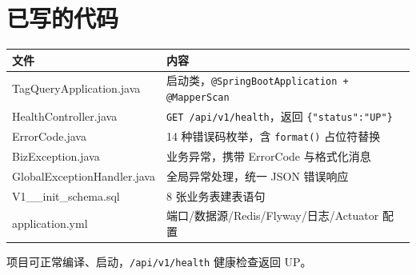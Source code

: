 \documentclass[12pt,a4paper]{ctexart}
\begin{document}
\section{已写的代码}

\begin{table}[h]
\centering
\begin{tabular}{lp{7cm}}
\toprule
文件 & 内容 \\
\midrule
\ttfamily TagQueryApplication.java & 启动类，\texttt{@SpringBootApplication + @MapperScan} \\
\ttfamily HealthController.java & \texttt{GET /api/v1/health}，返回 \texttt{\{"status":"UP"\}} \\
\ttfamily ErrorCode.java & 14 种错误码枚举，含 \texttt{format()} 占位符替换 \\
\ttfamily BizException.java & 业务异常，携带 ErrorCode 与格式化消息 \\
\ttfamily GlobalExceptionHandler.java & 全局异常处理，统一 JSON 错误响应 \\
\ttfamily V1\_\_init\_schema.sql & 8 张业务表建表语句 \\
\ttfamily application.yml & 端口/数据源/Redis/Flyway/日志/Actuator 配置 \\
\bottomrule
\end{tabular}
\end{table}

项目可正常编译、启动，\texttt{/api/v1/health} 健康检查返回 UP。
\end{document}
